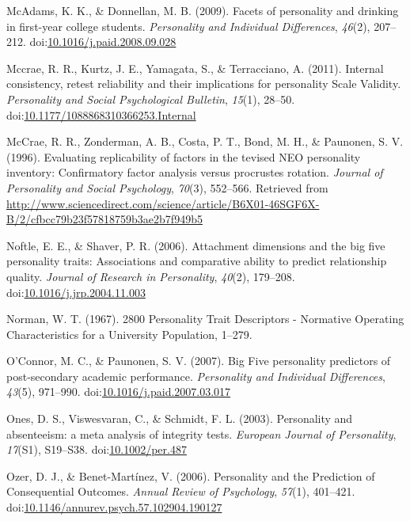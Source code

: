\documentclass[,man,floatsintext]{apa6}
\theoremstyle{definition}
\theoremstyle{definition}
\theoremstyle{definition}
\theoremstyle{remark}
\begin{document}
\leavevmode\hypertarget{ref-McAdams2009}{}%
McAdams, K. K., \& Donnellan, M. B. (2009). Facets of personality and
drinking in first-year college students. \emph{Personality and
Individual Differences}, \emph{46}(2), 207--212.
doi:\href{https://doi.org/10.1016/j.paid.2008.09.028}{10.1016/j.paid.2008.09.028}

\leavevmode\hypertarget{ref-Mccrae2011}{}%
Mccrae, R. R., Kurtz, J. E., Yamagata, S., \& Terracciano, A. (2011).
Internal consistency, retest reliability and their implications for
personality Scale Validity. \emph{Personality and Social Psychological
Bulletin}, \emph{15}(1), 28--50.
doi:\href{https://doi.org/10.1177/1088868310366253.Internal}{10.1177/1088868310366253.Internal}

\leavevmode\hypertarget{ref-McCrae1996}{}%
McCrae, R. R., Zonderman, A. B., Costa, P. T., Bond, M. H., \& Paunonen,
S. V. (1996). Evaluating replicability of factors in the tevised NEO
personality inventory: Confirmatory factor analysis versus procrustes
rotation. \emph{Journal of Personality and Social Psychology},
\emph{70}(3), 552--566. Retrieved from
\url{http://www.sciencedirect.com/science/article/B6X01-46SGF6X-B/2/cfbcc79b23f57818759b3ae2b7f949b5}

\leavevmode\hypertarget{ref-Noftle2006}{}%
Noftle, E. E., \& Shaver, P. R. (2006). Attachment dimensions and the
big five personality traits: Associations and comparative ability to
predict relationship quality. \emph{Journal of Research in Personality},
\emph{40}(2), 179--208.
doi:\href{https://doi.org/10.1016/j.jrp.2004.11.003}{10.1016/j.jrp.2004.11.003}

\leavevmode\hypertarget{ref-Norman1967}{}%
Norman, W. T. (1967). 2800 Personality Trait Descriptors - Normative
Operating Characteristics for a University Population, 1--279.

\leavevmode\hypertarget{ref-OConnor2007}{}%
O'Connor, M. C., \& Paunonen, S. V. (2007). Big Five personality
predictors of post-secondary academic performance. \emph{Personality and
Individual Differences}, \emph{43}(5), 971--990.
doi:\href{https://doi.org/10.1016/j.paid.2007.03.017}{10.1016/j.paid.2007.03.017}

\leavevmode\hypertarget{ref-Ones2003}{}%
Ones, D. S., Viswesvaran, C., \& Schmidt, F. L. (2003). Personality and
absenteeism: a meta analysis of integrity tests. \emph{European Journal
of Personality}, \emph{17}(S1), S19--S38.
doi:\href{https://doi.org/10.1002/per.487}{10.1002/per.487}

\leavevmode\hypertarget{ref-OzerBenet2006}{}%
Ozer, D. J., \& Benet-Martínez, V. (2006). Personality and the
Prediction of Consequential Outcomes. \emph{Annual Review of
Psychology}, \emph{57}(1), 401--421.
doi:\href{https://doi.org/10.1146/annurev.psych.57.102904.190127}{10.1146/annurev.psych.57.102904.190127}
\end{document}
